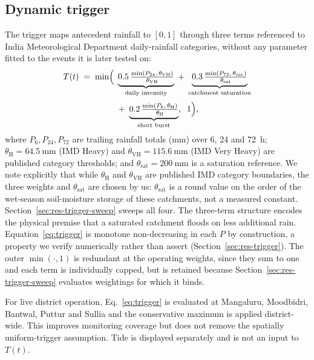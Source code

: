 \documentclass[10pt,twocolumn]{article}
\newcommand{\Tt}{T(t)}
\begin{document}
\subsection{Dynamic trigger}
\label{sec:method-trigger}
The trigger maps antecedent rainfall to $[0,1]$ through three terms referenced to
India Meteorological Department daily-rainfall categories, without any parameter
fitted to the events it is later tested on:
\begin{equation}
\begin{aligned}
\Tt \;=\; \min\Bigl(\;
&\underbrace{0.5\,\tfrac{\min(P_{24},\,\theta_{\mathrm{VH}})}{\theta_{\mathrm{VH}}}}_{\text{daily intensity}}
\;+\; \underbrace{0.3\,\tfrac{\min(P_{72},\,\theta_{\mathrm{sat}})}{\theta_{\mathrm{sat}}}}_{\text{catchment saturation}} \\[2pt]
&+\; \underbrace{0.2\,\tfrac{\min(P_{6},\,\theta_{\mathrm{H}})}{\theta_{\mathrm{H}}}}_{\text{short burst}},
\;\; 1 \Bigr),
\end{aligned}
\label{eq:trigger}
\end{equation}
where $P_{6},P_{24},P_{72}$ are trailing rainfall totals (\si{\milli\metre}) over
6, 24 and \SI{72}{\hour}; $\theta_{\mathrm{H}}=\SI{64.5}{\milli\metre}$ (IMD
Heavy) and $\theta_{\mathrm{VH}}=\SI{115.6}{\milli\metre}$ (IMD Very Heavy) are
published category thresholds; and $\theta_{\mathrm{sat}}=\SI{200}{\milli\metre}$
is a saturation reference. We note explicitly that while $\theta_{\mathrm{H}}$
and $\theta_{\mathrm{VH}}$ are published IMD category boundaries, the three
weights and $\theta_{\mathrm{sat}}$ are chosen by us: $\theta_{\mathrm{sat}}$ is
a round value on the order of the wet-season soil-moisture storage of these
catchments, not a measured constant. Section~\ref{sec:res-trigger-sweep} sweeps
all four. The three-term structure encodes the physical premise
that a saturated catchment floods on less additional rain. Equation~\eqref{eq:trigger}
is monotone non-decreasing in each $P$ by construction, a property we verify
numerically rather than assert (Section~\ref{sec:res-trigger}). The outer
$\min(\cdot,1)$ is redundant at the operating weights, since they sum to one and
each term is individually capped, but is retained because
Section~\ref{sec:res-trigger-sweep} evaluates weightings for which it binds.

For live district operation, Eq.~\eqref{eq:trigger} is evaluated at Mangaluru,
Moodbidri, Bantwal, Puttur and Sullia and the conservative maximum is applied
district-wide. This improves monitoring coverage but does not remove the
spatially uniform-trigger assumption. Tide is displayed separately and is not an
input to $T(t)$.
\end{document}
